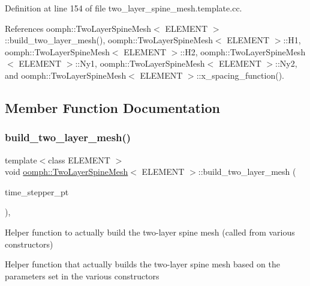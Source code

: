 Definition at line 154 of file two\+\_\+layer\+\_\+spine\+\_\+mesh.\+template.\+cc.



References oomph\+::\+Two\+Layer\+Spine\+Mesh$<$ E\+L\+E\+M\+E\+N\+T $>$\+::build\+\_\+two\+\_\+layer\+\_\+mesh(), oomph\+::\+Two\+Layer\+Spine\+Mesh$<$ E\+L\+E\+M\+E\+N\+T $>$\+::\+H1, oomph\+::\+Two\+Layer\+Spine\+Mesh$<$ E\+L\+E\+M\+E\+N\+T $>$\+::\+H2, oomph\+::\+Two\+Layer\+Spine\+Mesh$<$ E\+L\+E\+M\+E\+N\+T $>$\+::\+Ny1, oomph\+::\+Two\+Layer\+Spine\+Mesh$<$ E\+L\+E\+M\+E\+N\+T $>$\+::\+Ny2, and oomph\+::\+Two\+Layer\+Spine\+Mesh$<$ E\+L\+E\+M\+E\+N\+T $>$\+::x\+\_\+spacing\+\_\+function().



\subsection{Member Function Documentation}
\mbox{\label{classoomph_1_1TwoLayerSpineMesh_ada5471a89c3ac91a606b3e5dcc1325cd}} 
\subsubsection{\texorpdfstring{build\+\_\+two\+\_\+layer\+\_\+mesh()}{build\_two\_layer\_mesh()}}
{\footnotesize\ttfamily template$<$class E\+L\+E\+M\+E\+NT $>$ \\
void \hyperlink{classoomph_1_1TwoLayerSpineMesh}{oomph\+::\+Two\+Layer\+Spine\+Mesh}$<$ E\+L\+E\+M\+E\+NT $>$\+::build\+\_\+two\+\_\+layer\+\_\+mesh (\begin{DoxyParamCaption}\item[{Time\+Stepper $\ast$}]{time\+\_\+stepper\+\_\+pt }\end{DoxyParamCaption})\hspace{0.3cm}{\ttfamily [protected]}, {\ttfamily [virtual]}}



Helper function to actually build the two-\/layer spine mesh (called from various constructors) 

Helper function that actually builds the two-\/layer spine mesh based on the parameters set in the various constructors 

